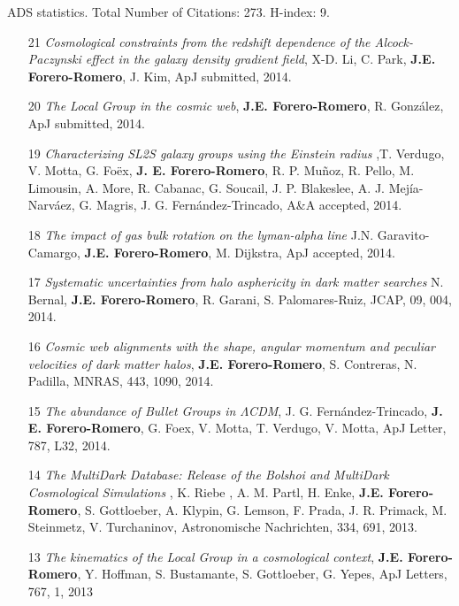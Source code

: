 \documentclass[9pt]{article}
\begin{document}
ADS statistics. Total Number of Citations: 273. H-index: 9.
\begin{enumerate}

\item[21]{\it Cosmological constraints from the redshift dependence of
  the Alcock-Paczynski effect in the galaxy density gradient field},
  X-D. Li, C. Park, {\bf J.E. Forero-Romero}, J. Kim, ApJ submitted,
  2014. 

\item[20]{\it The Local Group in the cosmic web}, {\bf
  J.E. Forero-Romero}, R. Gonz\'alez, ApJ submitted, 2014.

\item[19]{\it  Characterizing SL2S galaxy groups using the Einstein
  radius} ,T. Verdugo, V. Motta, G. Foëx, {\bf J. E. Forero-Romero},
  R. P. Muñoz, R. Pello, M. Limousin, A. More, R. Cabanac, G. Soucail,
  J. P. Blakeslee, A. J. Mejía-Narváez, G. Magris,
  J. G. Fernández-Trincado, A\&A accepted, 2014.

\item[18]{\it The impact of gas bulk rotation on the lyman-alpha line}
  J.N. Garavito-Camargo,  {\bf J.E. Forero-Romero}, M. Dijkstra, ApJ
  accepted, 2014. 

\item[17]{\it Systematic uncertainties from halo asphericity in dark
  matter searches}  N. Bernal, {\bf J.E. Forero-Romero}, R. Garani,
  S. Palomares-Ruiz, JCAP, 09, 004, 2014.

\item[16]{\it Cosmic web alignments with the shape, angular momentum
  and peculiar velocities of dark matter halos}, 
  {\bf J.E. Forero-Romero}, S. Contreras, N. Padilla, MNRAS, 443,
  1090, 2014. 

\item[15]{\it The abundance of Bullet Groups in $\Lambda$CDM},
  J. G. Fern\'andez-Trincado, {\bf J. E. Forero-Romero}, G. Foex,
  V. Motta, T. Verdugo, V. Motta, ApJ Letter, 787, L32, 2014.

\item[14]{\it The MultiDark Database: Release of the Bolshoi and
  MultiDark Cosmological Simulations} , K. Riebe , A. M. Partl,
  H. Enke, {\bf J.E. Forero-Romero}, S. Gottloeber, A. Klypin,
  G. Lemson, F. Prada, J. R. Primack, M. Steinmetz, V. Turchaninov,
  Astronomische Nachrichten, 334, 691, 2013. 

\item[13] {\it The kinematics of the Local Group in a cosmological context}, 
{\bf J.E. Forero-Romero}, Y. Hoffman, S. Bustamante, S. Gottloeber,
G. Yepes, ApJ Letters, 767, 1, 2013 



\end{enumerate}
\end{document}
